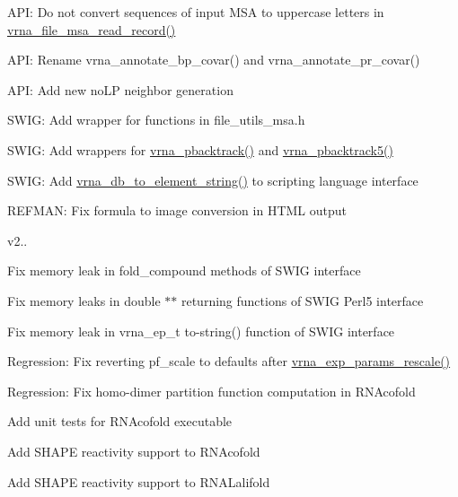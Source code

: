 \begin{DoxyItemize}
\item A\+PI\+: Do not convert sequences of input M\+SA to uppercase letters in \mbox{\hyperlink{group__file__utils_ga59204cd1daa4927f5127cc65a2886efd}{vrna\+\_\+file\+\_\+msa\+\_\+read\+\_\+record()}}
\item A\+PI\+: Rename vrna\+\_\+annotate\+\_\+bp\+\_\+covar() and vrna\+\_\+annotate\+\_\+pr\+\_\+covar()
\item A\+PI\+: Add new no\+LP neighbor generation
\item S\+W\+IG\+: Add wrapper for functions in file\+\_\+utils\+\_\+msa.\+h
\item S\+W\+IG\+: Add wrappers for \mbox{\hyperlink{group__subopt__stochbt_ga901fe42a33b07be083421741bf7dc610}{vrna\+\_\+pbacktrack()}} and \mbox{\hyperlink{group__subopt__stochbt_ga347375a4da8bdff74639529847f97d4f}{vrna\+\_\+pbacktrack5()}}
\item S\+W\+IG\+: Add \mbox{\hyperlink{group__struct__utils_ga45360c09fb6d04d96e42dcccbb66015b}{vrna\+\_\+db\+\_\+to\+\_\+element\+\_\+string()}} to scripting language interface
\item R\+E\+F\+M\+AN\+: Fix formula to image conversion in H\+T\+ML output
\end{DoxyItemize}

v2..
\begin{DoxyItemize}
\item Fix memory leak in fold\+\_\+compound methods of S\+W\+IG interface
\item Fix memory leaks in double $\ast$$\ast$ returning functions of S\+W\+IG Perl5 interface
\item Fix memory leak in vrna\+\_\+ep\+\_\+t to-\/string() function of S\+W\+IG interface
\item Regression\+: Fix reverting pf\+\_\+scale to defaults after \mbox{\hyperlink{group__energy__parameters_gad607bc3a5b5da16400e2ca4ea5560233}{vrna\+\_\+exp\+\_\+params\+\_\+rescale()}}
\item Regression\+: Fix homo-\/dimer partition function computation in R\+N\+Acofold
\item Add unit tests for R\+N\+Acofold executable
\item Add S\+H\+A\+PE reactivity support to R\+N\+Acofold
\item Add S\+H\+A\+PE reactivity support to R\+N\+A\+Lalifold
\end{DoxyItemize}

